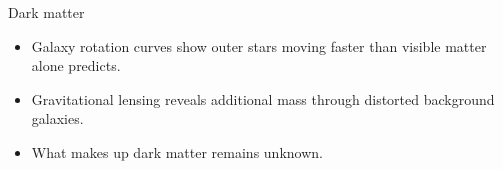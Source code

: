 \begin{frame}[t]{Dark matter}
  \begin{itemize}
    \setlength{\itemsep}{0.24cm}
    \item Galaxy rotation curves show outer stars moving faster than visible matter alone predicts.
    \item Gravitational lensing reveals additional mass through distorted background galaxies.
    \item What makes up dark matter remains unknown.
  \end{itemize}

  \vfill
\end{frame}
